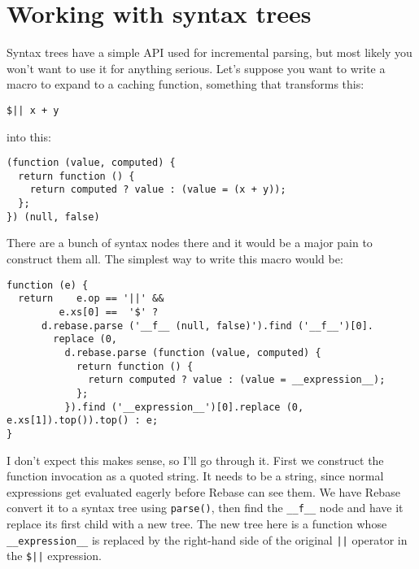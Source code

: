 \documentclass{report}
\begin{document}
\section {Working with syntax trees}
      Syntax trees have a simple API used for incremental parsing, but most likely you won't want to use it for anything serious. Let's suppose you want to write a macro to expand to a caching
      function, something that transforms this:

\begin{verbatim}
$|| x + y
\end{verbatim}

      \noindent into this:

\begin{verbatim}
(function (value, computed) {
  return function () {
    return computed ? value : (value = (x + y));
  };
}) (null, false)
\end{verbatim}

      There are a bunch of syntax nodes there and it would be a major pain to construct them all. The simplest way to write this macro would be:

\begin{verbatim}
function (e) {
  return    e.op == '||' &&
         e.xs[0] ==  '$' ?
      d.rebase.parse ('__f__ (null, false)').find ('__f__')[0].
        replace (0,
          d.rebase.parse (function (value, computed) {
            return function () {
              return computed ? value : (value = __expression__);
            };
          }).find ('__expression__')[0].replace (0, e.xs[1]).top()).top() : e;
}
\end{verbatim}

      I don't expect this makes sense, so I'll go through it. First we construct the function invocation as a quoted string. It needs to be a string, since normal expressions get evaluated
      eagerly before Rebase can see them. We have Rebase convert it to a syntax tree using \verb|parse()|, then find the \verb|__f__| node and have it replace its first child with a new tree.
      The new tree here is a function whose \verb|__expression__| is replaced by the right-hand side of the original \verb+||+ operator in the \verb+$||+ expression.
\end{document}
